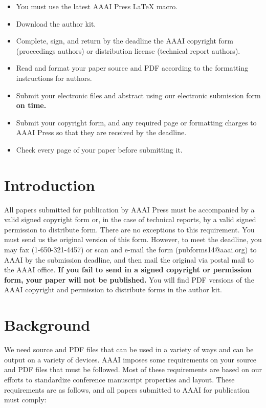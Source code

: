 \documentclass[letterpaper]{article}
\begin{document}
	\begin{itemize}
		\item You must use the latest AAAI Press \LaTeX{} macro.
		\item Download the author kit.
		\item Complete, sign, and return by the deadline the AAAI copyright form (proceedings authors) or distribution license (technical report authors).
		\item Read and format your paper source and PDF according to the formatting instructions for authors.
		\item Submit your electronic files and abstract using our electronic submission form \textbf{on time.}
		\item Submit your copyright form, and any required page or formatting charges to AAAI Press so that they are received by the deadline.
		\item Check every page of your paper before submitting it.
	\end{itemize}
	
	\section{Introduction}
	All papers submitted for publication by AAAI Press must be accompanied by a valid signed copyright form or, in the case of technical reports, by a valid signed permission to distribute form. There are no exceptions to this requirement. You must send us the original version of this form. However, to meet the deadline, you may fax (1-650-321-4457) or scan and e-mail the form (pubforms14@aaai.org) to AAAI by the submission deadline, and then mail the original via postal mail to the AAAI office. \textbf{If you fail to send in a signed copyright or permission form, your paper will not be published.} You will find PDF versions of the AAAI copyright and permission to distribute forms in the author kit.
	
	\section{Background}
	We need source and PDF files that can be used in a variety of ways and can be output on a variety of devices. AAAI imposes some requirements on your source and PDF files that must be followed. Most of these requirements are based on our efforts to standardize conference manuscript properties and layout. These requirements are as follows, and all papers submitted to AAAI for publication must comply:
	
\end{document}
